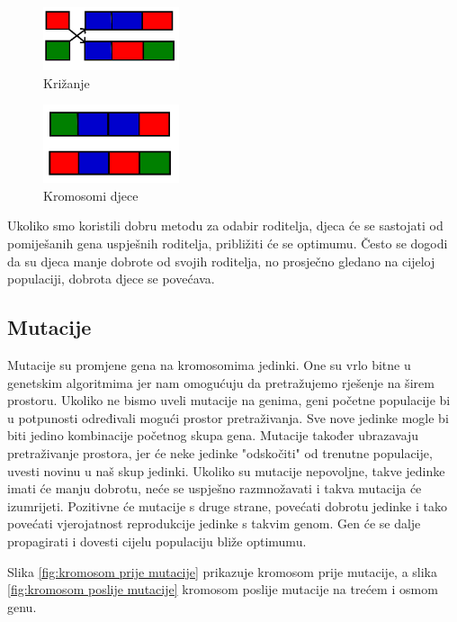 \documentclass[times, utf8, zavrsni]{fer}
\begin{document}
\begin{figure}[htb]
\centering
\includegraphics[width=4cm]{images/krizanje.png}
\caption{Križanje}
\label{fig:krizanje}
\end{figure}

\begin{figure}[htb]
\centering
\includegraphics[width=4cm]{images/kromosomi_djece.png}
\caption{Kromosomi djece}
\label{fig:kromosomi djece}
\end{figure}

Ukoliko smo koristili dobru metodu za odabir roditelja, djeca će se sastojati od pomiješanih gena uspješnih roditelja, približiti će se optimumu. Često se dogodi da su djeca manje dobrote od svojih roditelja, no prosječno gledano na cijeloj populaciji, dobrota djece se povećava.

\subsection{Mutacije}
Mutacije su promjene gena na kromosomima jedinki. One su vrlo bitne u genetskim algoritmima jer nam omogućuju da pretražujemo rješenje na širem prostoru. Ukoliko ne bismo uveli mutacije na genima, geni početne populacije bi u potpunosti određivali mogući prostor pretraživanja. Sve nove jedinke mogle bi biti jedino kombinacije početnog skupa gena. Mutacije također ubrazavaju pretraživanje prostora, jer će neke jedinke "odskočiti" od trenutne populacije, uvesti novinu u naš skup jedinki. Ukoliko su mutacije nepovoljne, takve jedinke imati će manju dobrotu, neće se uspješno razmnožavati i takva mutacija će izumrijeti. Pozitivne će mutacije s druge strane, povećati dobrotu jedinke i tako povećati vjerojatnost reprodukcije jedinke s takvim genom. Gen će se dalje propagirati i dovesti cijelu populaciju bliže optimumu.

Slika \ref{fig:kromosom prije mutacije} prikazuje kromosom prije mutacije, a slika \ref{fig:kromosom poslije mutacije} kromosom poslije mutacije na trećem i osmom genu.
\end{document}
